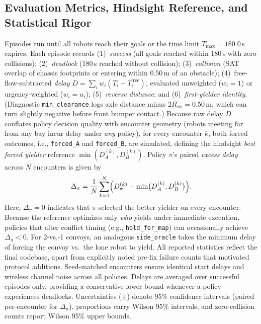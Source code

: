 \subsection{Evaluation Metrics, Hindsight Reference, and Statistical Rigor}
Episodes run until all robots reach their goals or the time limit $T_{\max} = 180.0$\,s expires. Each episode records (1)~\emph{success} (all goals reached within 180\,s with zero collisions); (2)~\emph{deadlock} (180\,s reached without collision); (3)~\emph{collision} (SAT overlap of chassis footprints or entering within 0.50\,m of an obstacle); (4)~free-flow-subtracted \emph{delay} $D = \sum_i w_i(T_i - T_i^{\mathrm{free}})$, evaluated unweighted ($w_i = 1$) or urgency-weighted ($w_i = u_i$); (5)~\emph{reverse distance}; and (6)~\emph{first-yielder identity}. (Diagnostic \texttt{min\_clearance} logs axle distance minus $2R_{\mathrm{sw}} = 0.50$\,m, which can turn slightly negative before front bumper contact.)
Because raw delay $D$ conflates policy decision quality with encounter geometry (robots meeting far from any bay incur delay under \emph{any} policy), for every encounter $k$, both forced outcomes, i.e., \texttt{forced\_A} and \texttt{forced\_B}, are simulated, defining the hindsight \emph{best forced yielder} reference $\min(D_A^{(k)}, D_B^{(k)})$. Policy $\pi$'s paired \emph{excess delay} across $N$ encounters is given by
\begin{equation}
\Delta_\pi = \frac{1}{N}\sum_{k=1}^{N}\Bigl(D_\pi^{(k)} - \min\bigl(D_A^{(k)}, D_B^{(k)}\bigr)\Bigr).
\label{eq:excess}
\end{equation}
Here, $\Delta_\pi = 0$ indicates that $\pi$ selected the better yielder on every encounter. Because the reference optimizes only \emph{who} yields under immediate execution, policies that alter conflict timing (e.g., \texttt{hold\_for\_map}) can occasionally achieve $\Delta_\pi < 0$. For 2-vs.-1 convoys, an analogous \texttt{side\_oracle} takes the minimum delay of forcing the convoy vs.\ the lone robot to yield.
All reported statistics reflect the final codebase, apart from explicitly noted pre-fix failure counts that motivated protocol additions. Seed-matched encounters ensure identical start delays and wireless channel noise across all policies. Delays are averaged over successful episodes only, providing a conservative lower bound whenever a policy experiences deadlocks. Uncertainties ($\pm$) denote 95\% confidence intervals (paired per-encounter for $\Delta_\pi$), proportions carry Wilson 95\% intervals, and zero-collision counts report Wilson 95\% upper bounds.